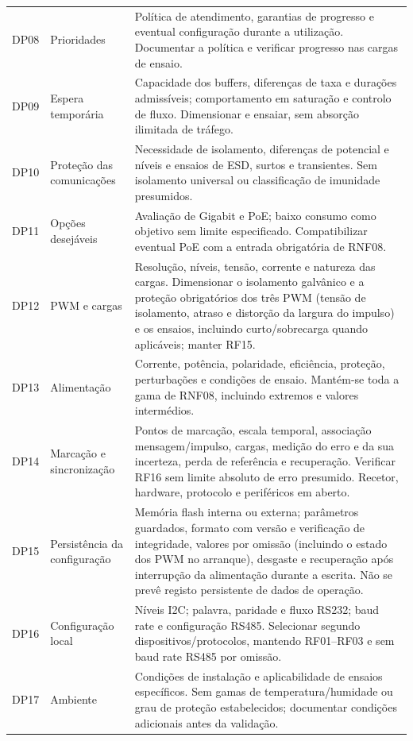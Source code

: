 \begin{longtable}{@{}>{\raggedright\arraybackslash}p{}>{\raggedright\arraybackslash}p{}>{\raggedright\arraybackslash}p{}@{}}
\addlinespace
DP08 & Prioridades & Política de atendimento, garantias de progresso e eventual configuração durante a utilização. Documentar a política e verificar progresso nas cargas de ensaio. \\
\addlinespace
DP09 & Espera temporária & Capacidade dos buffers, diferenças de taxa e durações admissíveis; comportamento em saturação e controlo de fluxo. Dimensionar e ensaiar, sem absorção ilimitada de tráfego. \\
\addlinespace
DP10 & Proteção das comunicações & Necessidade de isolamento, diferenças de potencial e níveis e ensaios de ESD, surtos e transientes. Sem isolamento universal ou classificação de imunidade presumidos. \\
\addlinespace
DP11 & Opções desejáveis & Avaliação de Gigabit e PoE; baixo consumo como objetivo sem limite especificado. Compatibilizar eventual PoE com a entrada obrigatória de RNF08. \\
\addlinespace
DP12 & PWM e cargas & Resolução, níveis, tensão, corrente e natureza das cargas. Dimensionar o isolamento galvânico e a proteção obrigatórios dos três PWM (tensão de isolamento, atraso e distorção da largura do impulso) e os ensaios, incluindo curto/sobrecarga quando aplicáveis; manter RF15. \\
\addlinespace
DP13 & Alimentação & Corrente, potência, polaridade, eficiência, proteção, perturbações e condições de ensaio. Mantém-se toda a gama de RNF08, incluindo extremos e valores intermédios. \\
\addlinespace
DP14 & Marcação e sincronização & Pontos de marcação, escala temporal, associação mensagem/impulso, cargas, medição do erro e da sua incerteza, perda de referência e recuperação. Verificar RF16 sem limite absoluto de erro presumido. Recetor, hardware, protocolo e periféricos em aberto. \\
\addlinespace
DP15 & Persistência da configuração & Memória flash interna ou externa; parâmetros guardados, formato com versão e verificação de integridade, valores por omissão (incluindo o estado dos PWM no arranque), desgaste e recuperação após interrupção da alimentação durante a escrita. Não se prevê registo persistente de dados de operação. \\
\addlinespace
DP16 & Configuração local & Níveis I2C; palavra, paridade e fluxo RS232; baud rate e configuração RS485. Selecionar segundo dispositivos/protocolos, mantendo RF01--RF03 e sem baud rate RS485 por omissão. \\
\addlinespace
DP17 & Ambiente & Condições de instalação e aplicabilidade de ensaios específicos. Sem gamas de temperatura/humidade ou grau de proteção estabelecidos; documentar condições adicionais antes da validação. \\
\end{longtable}
\endgroup
